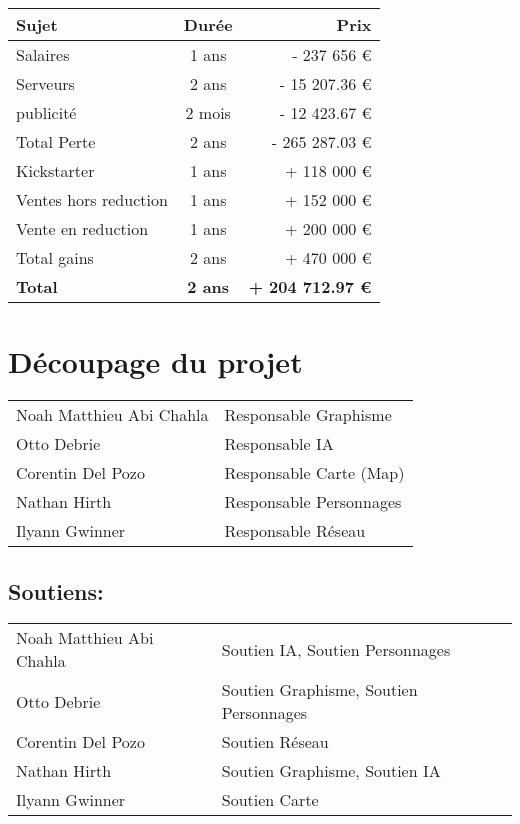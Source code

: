 \documentclass{article}
\begin{document}
\begin{tabular}{| l | c | r |} \hline
   \textbf{Sujet} & \textbf{Durée} & \textbf{Prix} \\ \hline
   Salaires & 1 ans & - 237 656 € \\ \hline
   Serveurs & 2 ans & - 15 207.36 € \\ \hline
   publicité & 2 mois & - 12 423.67 € \\ \hline
   Total Perte & 2 ans & - 265 287.03 € \\ \hline
   Kickstarter & 1 ans & + 118 000 € \\ \hline
   Ventes hors reduction & 1 ans & + 152 000 € \\ \hline
   Vente en reduction & 1 ans & + 200 000 € \\ \hline
   Total gains & 2 ans & + 470 000 € \\ \hline \hline
   \textbf{Total} & \textbf{2 ans} & \textbf{+ 204 712.97 €} \\ \hline
\end{tabular}
\pagebreak
\section{Découpage du projet}
\begin{tabular}{l l}
Noah Matthieu Abi Chahla & Responsable Graphisme \\
Otto Debrie & Responsable IA \\
Corentin Del Pozo & Responsable Carte (Map) \\
Nathan Hirth & Responsable Personnages \\
Ilyann Gwinner & Responsable Réseau \\
\end{tabular}

\subsection*{Soutiens:}
\begin{tabular}{l l}
Noah Matthieu Abi Chahla & Soutien IA, Soutien Personnages \\
Otto Debrie & Soutien Graphisme, Soutien Personnages \\
Corentin Del Pozo & Soutien Réseau \\
Nathan Hirth & Soutien Graphisme, Soutien IA \\
Ilyann Gwinner & Soutien Carte \\
\end{tabular}
\end{document}
